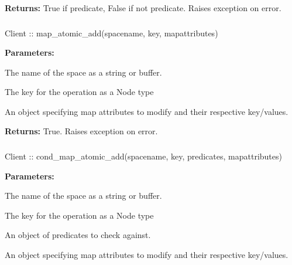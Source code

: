 \noindent\textbf{Returns:}
True if predicate, False if not predicate.  Raises exception on error.

\subsubsection{}
\label{api:nodejs:map_atomic_add}
\begin{javascriptcode}
Client :: map_atomic_add(spacename, key, mapattributes)
\end{javascriptcode}
\funcdesc 

\noindent\textbf{Parameters:}
\begin{description}[labelindent=\widthof{{\code{mapattributes}}},leftmargin=*,noitemsep,nolistsep,align=right]
\item[\code{spacename}] The name of the space as a string or buffer.
\item[\code{key}] The key for the operation as a Node type
\item[\code{mapattributes}] An object specifying map attributes to modify and their respective key/values.
\end{description}

\noindent\textbf{Returns:}
True.  Raises exception on error.

\subsubsection{}
\label{api:nodejs:cond_map_atomic_add}
\begin{javascriptcode}
Client :: cond_map_atomic_add(spacename, key, predicates, mapattributes)
\end{javascriptcode}
\funcdesc 

\noindent\textbf{Parameters:}
\begin{description}[labelindent=\widthof{{\code{mapattributes}}},leftmargin=*,noitemsep,nolistsep,align=right]
\item[\code{spacename}] The name of the space as a string or buffer.
\item[\code{key}] The key for the operation as a Node type
\item[\code{predicates}] An object of predicates to check against.
\item[\code{mapattributes}] An object specifying map attributes to modify and their respective key/values.
\end{description}

